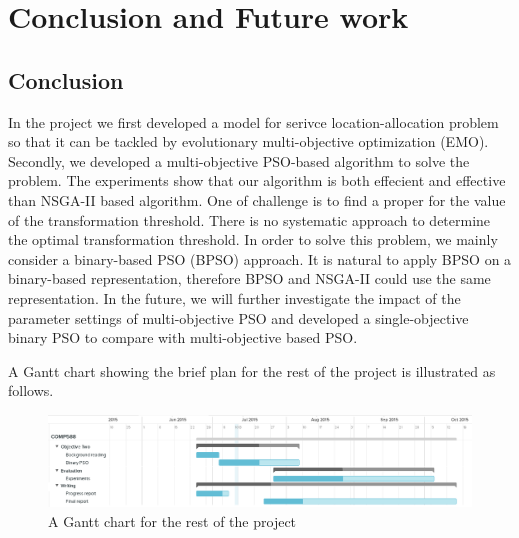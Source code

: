 \chapter{Conclusion and Future work}\label{C:con}

\section{Conclusion}

In the project we first developed a model for serivce location-allocation problem so that it can be 
tackled by evolutionary multi-objective optimization (EMO). Secondly, we developed a multi-objective PSO-based 
algorithm to solve the problem. The experiments show that our algorithm is both effecient and effective than 
NSGA-II based algorithm. One of challenge is to find a proper for the value of the 
transformation threshold. There is no systematic approach to determine the optimal transformation
threshold. In order to solve this problem, we mainly consider a binary-based PSO (BPSO) approach. It is natural to apply BPSO
on a binary-based representation, therefore BPSO and NSGA-II could use the same representation. 
In the future, we will  further investigate the impact of the parameter settings of
multi-objective PSO and developed a single-objective binary PSO to compare with multi-objective based PSO.

A Gantt chart showing the brief plan for the rest of the project is illustrated as follows.
\begin{figure}[h!]
	\centering
	\includegraphics[width=1\textwidth]{pics/timetable.png}
	\caption{A Gantt chart for the rest of the project}
\end{figure}


